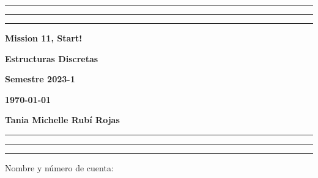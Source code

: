 \documentclass[12pt, a4paper]{exam}
\begin{document}
    \centering
    \hrule \hrule \hrule 
    \vspace{5mm}
    \begin{minipage}[c]{0.8\textwidth}
        \begin{center}
            {\large\textbf{Mission 11, Start!} \par
            \large \textbf{Estructuras Discretas} \par
            \large \textbf{Semestre 2023-1} \par
            \large \textbf{\today}	\par}
        \end{center}
    \end{minipage}

    \vspace{0.2in}
    \noindent
    \textbf{Tania Michelle Rubí Rojas}
    \vspace{2mm}
    \hrule \hrule \hrule 

    \vspace{5mm}
    \noindent
    Nombre y número de cuenta: \hrulefill\
\end{document}
